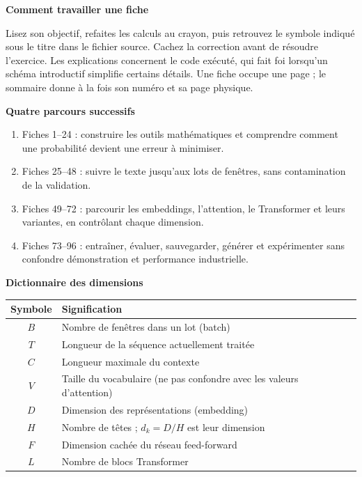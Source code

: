 \documentclass[a4paper,11pt]{article}
\begin{document}
\textbf{Comment travailler une fiche}

Lisez son objectif, refaites les calculs au crayon, puis retrouvez le symbole
indiqué sous le titre dans le fichier source. Cachez la correction avant de
résoudre l'exercice. Les explications concernent le code exécuté, qui fait foi
lorsqu'un schéma introductif simplifie certains détails. Une fiche occupe une
page ; le sommaire donne à la fois son numéro et sa page physique.

\textbf{Quatre parcours successifs}
\begin{enumerate}
  \setlength{\itemsep}{0pt}
  \setlength{\parskip}{0pt}
  \item Fiches 1--24 : construire les outils mathématiques et comprendre
        comment une probabilité devient une erreur à minimiser.
  \item Fiches 25--48 : suivre le texte jusqu'aux lots de fenêtres,
        sans contamination de la validation.
  \item Fiches 49--72 : parcourir les embeddings, l'attention, le
        Transformer et leurs variantes, en contrôlant chaque dimension.
  \item Fiches 73--96 : entraîner, évaluer, sauvegarder, générer et
        expérimenter sans confondre démonstration et performance industrielle.
\end{enumerate}

\textbf{Dictionnaire des dimensions}

\begin{center}
\begin{tabular}{cl}
\toprule
Symbole & Signification \\
\midrule
$B$ & Nombre de fenêtres dans un lot (batch) \\
$T$ & Longueur de la séquence actuellement traitée \\
$C$ & Longueur maximale du contexte \\
$V$ & Taille du vocabulaire (ne pas confondre avec les valeurs d'attention) \\
$D$ & Dimension des représentations (embedding) \\
$H$ & Nombre de têtes ; $d_k=D/H$ est leur dimension \\
$F$ & Dimension cachée du réseau feed-forward \\
$L$ & Nombre de blocs Transformer \\
\bottomrule
\end{tabular}
\end{center}
\end{document}
